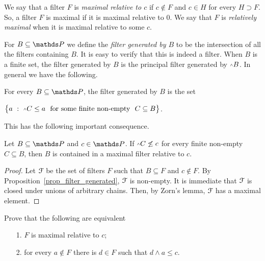 \documentclass[creche.tex]{subfiles}
\begin{document}
We say that a filter $F$ is \emph{maximal relative to $c$\/} if $c\notin F$ and $c\in H$ for every $H\supset F$. So, a filter $F$ is maximal if it is maximal relative to $0$. We say that  $F$ is \emph{relatively maximal\/} when it is maximal relative to some $c$. 

For $B\subseteq\PP$ we define the \emph{filter generated by $B$\/} to be the intersection of all the filters containing $B$. It is easy to verify that this is indeed a filter.  When $B$ is a finite set, the filter generated by $B$ is the principal filter generated by $\swedge B$. In general we have the following.


\begin{proposition} \label{prop_filter_generated}
For every $B\subseteq \PP$, the filter generated by $B$ is the set 

\hfill$\big\{a\ :\ \swedge C\le a\ \textrm{ for some finite non-empty }\ C\subseteq B\big\}$.\QED
\end{proposition}

This has the following important consequence.

\begin{proposition}\label{esistenzamassimale2}
Let $B\subseteq \PP$ and $c\in \PP$. If $\swedge C\not\le c$ for every finite non-empty $C\subseteq B$, then $B$ is contained in a maximal filter relative to $c$.
\end{proposition}

\begin{proof}
Let $\EuScript F$ be the set of filters $F$ such that $B\subseteq F$ and $c\notin F$. By Proposition~\ref{prop_filter_generated}, $\EuScript F$ is non-empty. It is immediate that $\EuScript F$ is closed under unions of arbitrary chains. Then, by Zorn's lemma, $\EuScript F$ has a maximal element.
\end{proof}

\begin{exercise}\label{ex_maximal_equivalent}
Prove that the following are equivalent
\begin{itemize}
\item[1.] $F$ is maximal relative to $c$;
\item[2.] for every $a\notin F$ there is $d\in F$ such that $d\wedge a\le c$.
\end{itemize}
\end{exercise}
\end{document}

